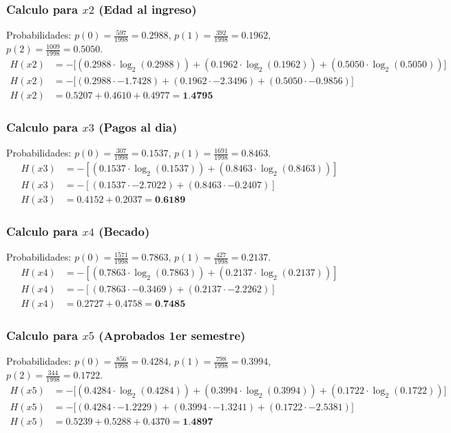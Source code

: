 \documentclass[12pt,a4paper]{article}
\begin{document}
\subsubsection{Calculo para $x2$ (Edad al ingreso)}
Probabilidades: $p(0) = \frac{597}{1998} = 0.2988$, $p(1) = \frac{392}{1998} = 0.1962$, $p(2) = \frac{1009}{1998} = 0.5050$.
\begin{align*}
    H(x2) &= -\big[ (0.2988 \cdot \log_2(0.2988)) + (0.1962 \cdot \log_2(0.1962)) + (0.5050 \cdot \log_2(0.5050)) \big] \\
    H(x2) &= -\big[ (0.2988 \cdot -1.7428) + (0.1962 \cdot -2.3496) + (0.5050 \cdot -0.9856) \big] \\
    H(x2) &= 0.5207 + 0.4610 + 0.4977 = \textbf{1.4795}
\end{align*}

\subsubsection{Calculo para $x3$ (Pagos al dia)}
Probabilidades: $p(0) = \frac{307}{1998} = 0.1537$, $p(1) = \frac{1691}{1998} = 0.8463$.
\begin{align*}
    H(x3) &= -\left[ (0.1537 \cdot \log_2(0.1537)) + (0.8463 \cdot \log_2(0.8463)) \right] \\
    H(x3) &= -\left[ (0.1537 \cdot -2.7022) + (0.8463 \cdot -0.2407) \right] \\
    H(x3) &= 0.4152 + 0.2037 = \textbf{0.6189}
\end{align*}

\subsubsection{Calculo para $x4$ (Becado)}
Probabilidades: $p(0) = \frac{1571}{1998} = 0.7863$, $p(1) = \frac{427}{1998} = 0.2137$.
\begin{align*}
    H(x4) &= -\left[ (0.7863 \cdot \log_2(0.7863)) + (0.2137 \cdot \log_2(0.2137)) \right] \\
    H(x4) &= -\left[ (0.7863 \cdot -0.3469) + (0.2137 \cdot -2.2262) \right] \\
    H(x4) &= 0.2727 + 0.4758 = \textbf{0.7485}
\end{align*}

\subsubsection{Calculo para $x5$ (Aprobados 1er semestre)}
Probabilidades: $p(0) = \frac{856}{1998} = 0.4284$, $p(1) = \frac{798}{1998} = 0.3994$, $p(2) = \frac{344}{1998} = 0.1722$.
\begin{align*}
    H(x5) &= -\big[ (0.4284 \cdot \log_2(0.4284)) + (0.3994 \cdot \log_2(0.3994)) + (0.1722 \cdot \log_2(0.1722)) \big] \\
    H(x5) &= -\big[ (0.4284 \cdot -1.2229) + (0.3994 \cdot -1.3241) + (0.1722 \cdot -2.5381) \big] \\
    H(x5) &= 0.5239 + 0.5288 + 0.4370 = \textbf{1.4897}
\end{align*}
\end{document}
